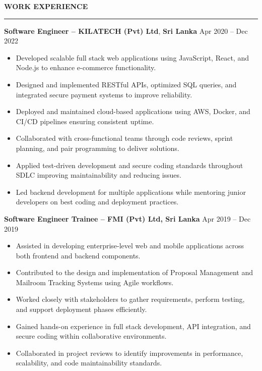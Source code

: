 \documentclass[10pt,letterpaper]{article}
\begin{document}
\vspace{8pt}

\textbf{WORK EXPERIENCE}\\[-8pt]
\noindent\rule{\textwidth}{1pt}

\vspace{-2pt}

\textbf{Software Engineer -- KILATECH (Pvt) Ltd}, \textbf{Sri Lanka} \hfill Apr 2020 -- Dec 2022

\vspace{-1pt}

\begin{itemize}
\item Developed scalable full stack web applications using JavaScript, React, and Node.js to enhance e-commerce functionality.
\item Designed and implemented RESTful APIs, optimized SQL queries, and integrated secure payment systems to improve reliability.
\item Deployed and maintained cloud-based applications using AWS, Docker, and CI/CD pipelines ensuring consistent uptime.
\item Collaborated with cross-functional teams through code reviews, sprint planning, and pair programming to deliver solutions.
\item Applied test-driven development and secure coding standards throughout SDLC improving maintainability and reducing issues.
\item Led backend development for multiple applications while mentoring junior developers on best coding and deployment practices.
\end{itemize}

\textbf{Software Engineer Trainee -- FMI (Pvt) Ltd, Sri Lanka} \hfill Apr 2019 -- Dec 2019

\vspace{-1pt}

\begin{itemize}
\item Assisted in developing enterprise-level web and mobile applications across both frontend and backend components.
\item Contributed to the design and implementation of Proposal Management and Mailroom Tracking Systems using Agile workflows.
\item Worked closely with stakeholders to gather requirements, perform testing, and support deployment phases efficiently.
\item Gained hands-on experience in full stack development, API integration, and secure coding within collaborative environments.
\item Collaborated in project reviews to identify improvements in performance, scalability, and code maintainability standards.
\end{itemize}
\end{document}

